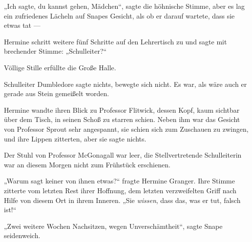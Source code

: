 „Ich sagte, du kannst gehen, Mädchen“, sagte die höhnische Stimme, aber es lag ein zufriedenes Lächeln auf Snapes Gesicht, als ob er darauf wartete, dass sie etwas tat —

Hermine schritt weitere fünf Schritte auf den Lehrertisch zu und sagte mit brechender Stimme:
„Schulleiter?“

Völlige Stille erfüllte die Große Halle.

Schulleiter Dumbledore sagte nichts, bewegte sich nicht. Es war, als wäre auch er gerade aus Stein gemeißelt worden.

Hermine wandte ihren Blick zu Professor Flitwick, dessen Kopf, kaum sichtbar über dem Tisch, in seinen Schoß zu starren schien. Neben ihm war das Gesicht von Professor Sprout sehr angespannt, sie schien sich zum Zuschauen zu zwingen, und ihre Lippen zitterten, aber sie sagte nichts.

Der Stuhl von Professor McGonagall war leer, die Stellvertretende Schulleiterin war an diesem Morgen nicht zum Frühstück erschienen.

„Warum sagt keiner von ihnen etwas?“ fragte Hermine Granger. Ihre Stimme zitterte vom letzten Rest ihrer Hoffnung, dem letzten verzweifelten Griff nach Hilfe von diesem Ort in ihrem Inneren.
„Sie \emph{wissen}, dass das, was er tut, falsch ist!“

„Zwei weitere Wochen Nachsitzen, wegen Unverschämtheit“, sagte Snape seidenweich.


